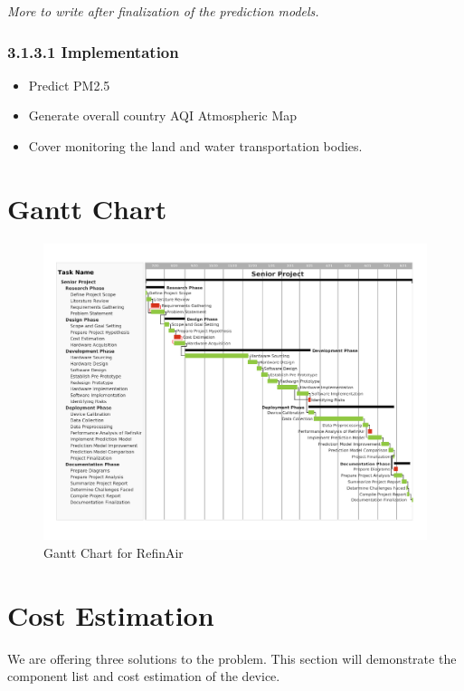 \emph{More to write after finalization of the prediction models.}

\vspace{0.5cm}
\subsubsection{3.1.3.1  Implementation}
\vspace{0.5cm}

\begin{itemize}
\item Predict PM2.5
\item Generate overall country AQI Atmospheric Map
 \item Cover monitoring the land and water transportation bodies.
\end{itemize}


\section{Gantt Chart}
\begin{figure} [H]
    \centering
    \includegraphics[width=1.1\textwidth]{images/3_2_Gantt Chart.png}
    \caption{Gantt Chart for RefinAir}
    \label{fig:Gantt Chart for RefinAir}
\end{figure}

\vspace{0.5cm}
\section{Cost Estimation}
\vspace{0.5cm}
We are offering three solutions to the problem. This section will demonstrate the component list and cost estimation of the device.

